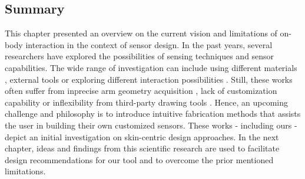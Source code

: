 \subsection{Summary}
This chapter presented an overview on the current vision and limitations of on-body interaction in the context of sensor design. In the past years, several researchers have explored the possibilities of sensing techniques and sensor capabilities. The wide range of investigation can include using different materials \cite{Lo:2016:SDC:2901790.2901885}, external tools \cite{Gannon:2016:EOF:2858036.2858576} or exploring different interaction possibilities \cite{Harrison:2012:OIA:2148131.2148148}. Still, these works often suffer from inprecise arm geometry acquisition \cite{ Gannon:2015:TSA:2702123.2702581}, lack of customization capability \cite{Kao:2016:DRP:2971763.2971777} or inflexibility from third-party drawing tools \cite{Kao:2016:DRP:2971763.2971777, Lo:2016:SDC:2901790.2901885}. Hence, an upcoming challenge and philosophy is to introduce intuitive fabrication methods that assists the user in building their own customized sensors. These works - including ours - depict an initial investigation on skin-centric design approaches. In the next chapter, ideas and findings from this scientific research are used to facilitate design recommendations for our tool and to overcome the prior mentioned limitations.

\newpage
\pagebreak